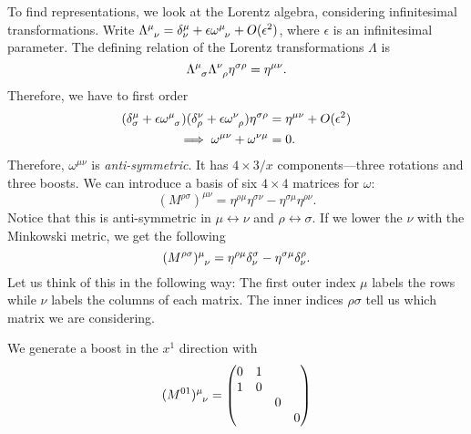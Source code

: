 To find representations, we look at the Lorentz algebra, considering infinitesimal transformations.
Write $\Lambda \indices{^{\mu}_{\nu}} = \delta^{\mu}_{\nu} + \epsilon \omega \indices{^{\mu}_{\nu}} + O(\epsilon^2)$, where $\epsilon$ is an infinitesimal parameter.
The defining relation of the Lorentz transformations $\Lambda$ is
\begin{equation}
  \Lambda \indices{^{\mu}_{\sigma}} \Lambda \indices{^{\nu}_{\rho}} \eta^{\sigma\rho} = \eta^{\mu\nu}.
\end{equation}
Therefore, we have to first order
\begin{align}
  (\delta^{\mu}_{\sigma} + \epsilon \omega \indices{^{\mu}_{\sigma}}) (\delta^{\nu}_{\rho} + \epsilon \omega \indices{^{\nu}_{\rho}}) \eta^{\sigma\rho} &= \eta^{\mu\nu} + O(\epsilon^2) \\
															  \implies \omega^{\mu\nu} + \omega^{\nu\mu} &= 0.
\end{align}
Therefore, $\omega^{\mu\nu}$ is \emph{anti-symmetric}.
It has $4 \times 3 / x$ components---three rotations and three boosts.
We can introduce a basis of six $4 \times 4$ matrices for $\omega$:
\begin{equation}
  (M^{\rho\sigma})^{\mu\nu} = \eta^{\rho\mu} \eta^{\sigma\nu} - \eta^{\sigma\mu} \eta^{\rho\nu}.
\end{equation}
Notice that this is anti-symmetric in $\mu \leftrightarrow \nu$ and $\rho \leftrightarrow \sigma$.
If we lower the $\nu$ with the Minkowski metric, we get the following
\begin{equation}
  (M^{\rho\sigma}) \indices{^{\mu}_{\nu}} = \eta^{\rho\mu} \delta^{\sigma}_{\nu} - \eta^{\sigma\mu} \delta^{\rho}_{\nu}.
\end{equation}
Let us think of this in the following way: The first outer index $\mu$ labels the rows while $\nu$ labels the columns of each matrix. The inner indices $\rho\sigma$ tell us which matrix we are considering.
\begin{example}[]
  We generate a boost in the $x^1$ direction with
  \begin{equation}
    (M^{01}) \indices{^{\mu}_{\nu}} = 
    \begin{pmatrix}
     0 & 1 &  &  \\
     1 & 0 &  &  \\
      &  & 0 &  \\
      &  &  & 0 \\
    \end{pmatrix}
  \end{equation}
\end{example}
